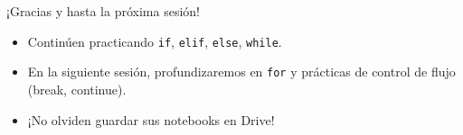 \documentclass[10pt]{beamer}
\begin{document}
\begin{frame}
  \huge{\centerline{¡Gracias y hasta la próxima sesión!}}
  \vspace{0.3cm}
  \normalsize
  \begin{itemize}
    \item Continúen practicando \texttt{if}, \texttt{elif}, \texttt{else}, \texttt{while}.
    \item En la siguiente sesión, profundizaremos en \texttt{for} y prácticas de control de flujo (break, continue).
    \item ¡No olviden guardar sus notebooks en Drive!
  \end{itemize}
\end{frame}
\end{document}
